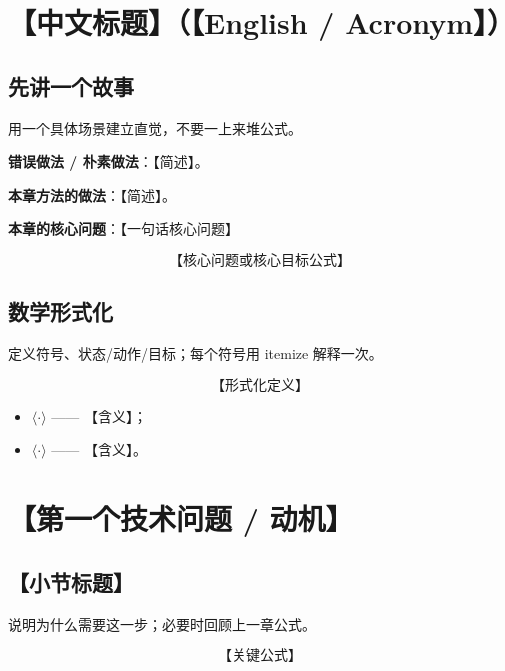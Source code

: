 \documentclass{article}
\begin{document}
\section*{【中文标题】（【English / Acronym】）}

\subsection*{先讲一个故事}

用一个具体场景建立直觉，不要一上来堆公式。

\textbf{错误做法 / 朴素做法}：【简述】。

\textbf{本章方法的做法}：【简述】。

\textbf{本章的核心问题}：【一句话核心问题】

\[
\boxed{\text{【核心问题或核心目标公式】}}
\]

\subsection*{数学形式化}

定义符号、状态/动作/目标；每个符号用 itemize 解释一次。

\[
\boxed{\text{【形式化定义】}}
\]

\begin{itemize}
  \item $\langle\cdot\rangle$ —— 【含义】；
  \item $\langle\cdot\rangle$ —— 【含义】。
\end{itemize}

\section*{【第一个技术问题 / 动机】}

\subsection*{【小节标题】}

说明为什么需要这一步；必要时回顾上一章公式。

\[
\text{【关键公式】}
\]

\end{document}
